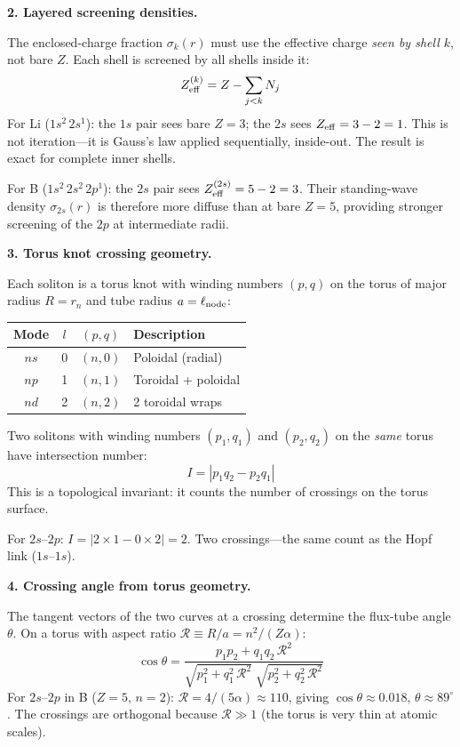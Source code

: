 \noindent\textbf{2. Layered screening densities.}

The enclosed-charge fraction $\sigma_k(r)$
must use the effective charge \emph{seen by
shell $k$}, not bare $Z$.  Each shell is
screened by all shells inside it:
\begin{equation}
    Z_{\rm eff}^{(k)} = Z - \sum_{j < k} N_j
    \label{eq:z_layered}
\end{equation}
For Li ($1s^2\,2s^1$): the $1s$ pair sees
bare $Z = 3$; the $2s$ sees
$Z_{\rm eff} = 3 - 2 = 1$.  This is not
iteration---it is Gauss's law applied
sequentially, inside-out.  The result is
exact for complete inner shells.

For B ($1s^2\,2s^2\,2p^1$): the $2s$ pair sees
$Z_{\rm eff}^{(2s)} = 5 - 2 = 3$.  Their
standing-wave density $\sigma_{2s}(r)$ is
therefore more diffuse than at bare $Z = 5$,
providing stronger screening of the $2p$ at
intermediate radii.

\noindent\textbf{3. Torus knot crossing geometry.}

Each soliton is a torus knot with winding
numbers $(p, q)$ on the torus of major radius
$R = r_n$ and tube radius $a = \ell_{\rm node}$:
\begin{center}
\small
\renewcommand{\arraystretch}{1.2}
\begin{tabular}{c c c l}
\toprule
\textbf{Mode} & $l$ & $(p, q)$ &
\textbf{Description} \\
\midrule
$ns$ & 0 & $(n, 0)$ & Poloidal (radial) \\
$np$ & 1 & $(n, 1)$ & Toroidal + poloidal \\
$nd$ & 2 & $(n, 2)$ & 2 toroidal wraps \\
\bottomrule
\end{tabular}
\end{center}

Two solitons with winding numbers
$(p_1, q_1)$ and $(p_2, q_2)$ on the \emph{same}
torus have intersection number:
\begin{equation}
    I = |p_1 q_2 - p_2 q_1|
    \label{eq:intersection_number}
\end{equation}
This is a topological invariant: it counts
the number of crossings on the torus surface.

For $2s$--$2p$:
$I = |2 \times 1 - 0 \times 2| = 2$.
Two crossings---the same count as the
Hopf link ($1s$--$1s$).

\noindent\textbf{4. Crossing angle from torus
geometry.}

The tangent vectors of the two curves at
a crossing determine the flux-tube angle
$\theta$.  On a torus with aspect ratio
$\mathcal{R} \equiv R/a = n^2/(Z\alpha)$:
\begin{equation}
    \cos\theta = \frac{p_1 p_2 + q_1 q_2\,
    \mathcal{R}^2}{\sqrt{p_1^2 + q_1^2\,
    \mathcal{R}^2}\;\sqrt{p_2^2 + q_2^2\,
    \mathcal{R}^2}}
    \label{eq:crossing_angle}
\end{equation}
For $2s$--$2p$ in B ($Z = 5$, $n = 2$):
$\mathcal{R} = 4/(5\alpha) \approx 110$,
giving $\cos\theta \approx 0.018$,
$\theta \approx 89^\circ$.  The crossings
are orthogonal because $\mathcal{R} \gg 1$
(the torus is very thin at atomic scales).

